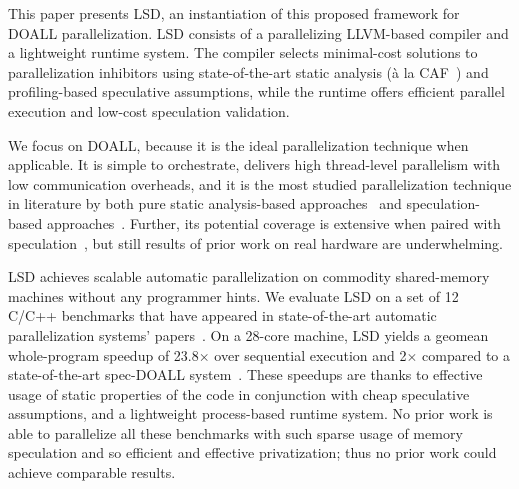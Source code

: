 This paper presents LSD, an instantiation of this proposed framework for DOALL
parallelization. LSD consists of a parallelizing LLVM-based compiler and a
lightweight
runtime system. The compiler selects minimal-cost solutions to parallelization
inhibitors using state-of-the-art static analysis (\`{a} la
CAF~\cite{johnson:cgo:17}) and profiling-based speculative assumptions, while
the runtime offers efficient parallel execution and low-cost speculation
validation.
%

We focus on DOALL, because it is the ideal parallelization technique when
applicable. It is simple to orchestrate, delivers high thread-level parallelism
with low communication overheads, and it is the most studied parallelization
technique in literature by both pure static analysis-based
approaches~\cite{..,.,..} and speculation-based approaches~\cite{..,..,..,..}.
Further, its potential coverage is extensive when paired with
speculation~\cite{zhong:08:hpca}, but still results of prior work on real
hardware are underwhelming.

LSD achieves scalable automatic parallelization on commodity shared-memory
machines without any programmer hints.  We evaluate LSD on a set of 12 C/C++
benchmarks that have appeared in state-of-the-art automatic parallelization systems'
papers~\cite{johnson:12:pldi,kim:12:cgo,campanoni:12:cgo}. On a 28-core machine,
LSD yields a geomean whole-program speedup of 23.8$\times$ over sequential execution and
2$\times$ compared to a state-of-the-art spec-DOALL system~\cite{johnson:12:pldi}.
These speedups are thanks to effective usage of static properties of the code in
conjunction with cheap speculative assumptions,
%
and a lightweight process-based runtime system.  No prior work
is able to parallelize all these benchmarks with such sparse usage of memory
speculation and so efficient and effective privatization; thus no prior work
could achieve comparable results.
